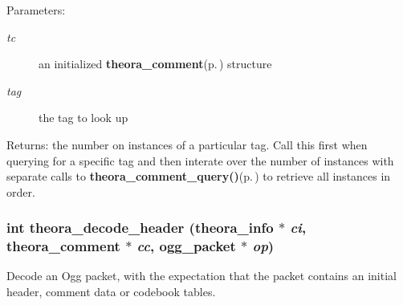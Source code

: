\begin{Desc}
\item[Parameters:]
\begin{description}
\item[{\em tc}]an initialized {\bf theora\_\-comment}{\rm (p.\,\pageref{structtheora__comment})} structure \item[{\em tag}]the tag to look up \end{description}
\end{Desc}
\begin{Desc}
\item[Returns:]the number on instances of a particular tag. Call this first when querying for a specific tag and then interate over the number of instances with separate calls to {\bf theora\_\-comment\_\-query()}{\rm (p.\,\pageref{theora_8h_a35})} to retrieve all instances in order. \end{Desc}
\subsubsection{\setlength{\rightskip}{0pt plus 5cm}int theora\_\-decode\_\-header ({\bf theora\_\-info} $\ast$ {\em ci}, {\bf theora\_\-comment} $\ast$ {\em cc}, ogg\_\-packet $\ast$ {\em op})}\label{theora_8h_a21}


Decode an Ogg packet, with the expectation that the packet contains an initial header, comment data or codebook tables. 


